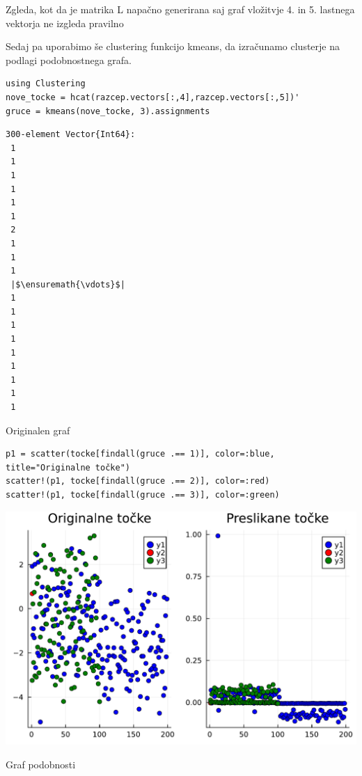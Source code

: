 \documentclass[12pt,a4paper]{article}
\begin{document}
Zgleda, kot da je matrika L napačno generirana saj graf vložitvje 4. in 5. lastnega vektorja ne izgleda pravilno


Sedaj pa uporabimo še clustering funkcijo kmeans, da izračunamo clusterje na podlagi podobnostnega grafa.


\begin{verbatim}
using Clustering
nove_tocke = hcat(razcep.vectors[:,4],razcep.vectors[:,5])'
gruce = kmeans(nove_tocke, 3).assignments
\end{verbatim}
\begin{verbatim}
300-element Vector{Int64}:
 1
 1
 1
 1
 1
 1
 2
 1
 1
 1
 |$\ensuremath{\vdots}$|
 1
 1
 1
 1
 1
 1
 1
 1
 1
\end{verbatim}

Originalen graf


\begin{verbatim}
p1 = scatter(tocke[findall(gruce .== 1)], color=:blue, title="Originalne točke")
scatter!(p1, tocke[findall(gruce .== 2)], color=:red)
scatter!(p1, tocke[findall(gruce .== 3)], color=:green)
\end{verbatim}
\includegraphics[width=\linewidth]{jl_Y5bBlk/demo_6_1.pdf}

Graf podobnosti
\end{document}
